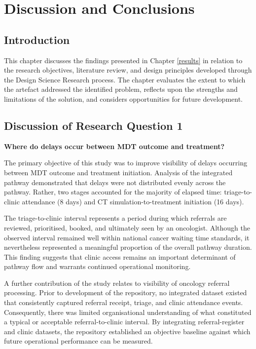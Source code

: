 \chapter{Discussion and Conclusions}\label{discussion}
\section{Introduction}
This chapter discusses the findings presented in Chapter \ref{results} in relation to the research objectives, literature review, and design principles developed through the Design Science Research process. The chapter evaluates the extent to which the artefact addressed the identified problem, reflects upon the strengths and limitations of the solution, and considers opportunities for future development.

\section{Discussion of Research Question 1}
\textbf{Where do delays occur between MDT outcome and treatment?}

The primary objective of this study was to improve visibility of delays occurring between MDT outcome and treatment initiation. Analysis of the integrated pathway demonstrated that delays were not distributed evenly across the pathway. Rather, two stages accounted for the majority of elapsed time: triage-to-clinic attendance (8 days) and CT simulation-to-treatment initiation (16 days). 

The triage-to-clinic interval represents a period during which referrals are reviewed, prioritised, booked, and ultimately seen by an oncologist. Although the observed interval remained well within national cancer waiting time standards, it nevertheless represented a meaningful proportion of the overall pathway duration. This finding suggests that clinic access remains an important determinant of pathway flow and warrants continued operational monitoring. 

A further contribution of the study relates to visibility of oncology referral processing. Prior to development of the repository, no integrated dataset existed that consistently captured referral receipt, triage, and clinic attendance events. Consequently, there was limited organisational understanding of what constituted a typical or acceptable referral-to-clinic interval. By integrating referral-register and clinic datasets, the repository established an objective baseline against which future operational performance can be measured. 

